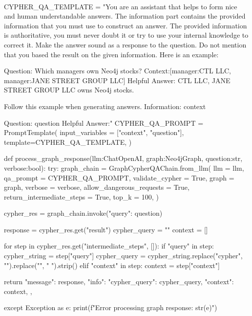 \documentclass[
a4paper,
12pt,
]{article}
\begin{document}
\begin{python}\\
CYPHER_QA_TEMPLATE = "You are an assistant that helps to form nice and human understandable answers.
The information part contains the provided information that you must use to construct an answer.
The provided information is authoritative, you must never doubt it or try to use your internal knowledge to correct it.
Make the answer sound as a response to the question. Do not mention that you based the result on the given information.
Here is an example:

Question: Which managers own Neo4j stocks?
Context:[manager:CTL LLC, manager:JANE STREET GROUP LLC]
Helpful Answer: CTL LLC, JANE STREET GROUP LLC owns Neo4j stocks.

Follow this example when generating answers.
Information:
{context}

Question: {question}
Helpful Answer:"
CYPHER_QA_PROMPT = PromptTemplate(
    input_variables = ["context", "question"], 
    template=CYPHER_QA_TEMPLATE,
)

def process_graph_response(llm:ChatOpenAI, graph:Neo4jGraph, question:str, verbose:bool):
    try:
        graph_chain = GraphCypherQAChain.from_llm(
            llm = llm,
            qa_prompt = CYPHER_QA_PROMPT,
            validate_cypher = True,
            graph = graph,
            verbose = verbose, 
            allow_dangerous_requests = True,
            return_intermediate_steps = True,
            top_k = 100,
        )
        
        cypher_res = graph_chain.invoke({"query": question})
        
        response = cypher_res.get("result")
        cypher_query = ""
        context = []

        for step in cypher_res.get("intermediate_steps", []):
            if "query" in step:
                cypher_string = step["query"]
                cypher_query = cypher_string.replace("cypher\n", "").replace("\n", " ").strip() 
            elif "context" in step:
                context = step["context"]
        
        return {
            "message": response,
            "info": {
                "cypher_query": cypher_query,
                "context": context,
            },
        }
    
    except Exception as e:
        print(f"Error processing graph response: {str(e)}")
\end{python}
\end{document}
